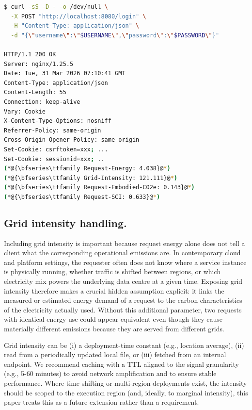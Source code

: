 \begin{lstlisting}[float,language=bash,caption={Example response headers from the prototype nginx module (from the outline).},label={lst:curl}]
$ curl -sS -D - -o /dev/null \
  -X POST "http://localhost:8080/login" \
  -H "Content-Type: application/json" \
  -d "{\"username\":\"$USERNAME\",\"password\":\"$PASSWORD\"}"

HTTP/1.1 200 OK
Server: nginx/1.25.5
Date: Tue, 31 Mar 2026 07:10:41 GMT
Content-Type: application/json
Content-Length: 55
Connection: keep-alive
Vary: Cookie
X-Content-Type-Options: nosniff
Referrer-Policy: same-origin
Cross-Origin-Opener-Policy: same-origin
Set-Cookie: csrftoken=xxx; ...
Set-Cookie: sessionid=xxx; ..
(*@{\bfseries\ttfamily Request-Energy: 4.038}@*)
(*@{\bfseries\ttfamily Grid-Intensity: 121.111}@*)
(*@{\bfseries\ttfamily Request-Embodied-CO2e: 0.143}@*)
(*@{\bfseries\ttfamily Request-SCI: 0.633}@*)
\end{lstlisting}


\subsection{Grid intensity handling.}
Including grid intensity is important because request energy alone does not tell a client what the corresponding operational emissions are. In contemporary cloud and platform settings, the requester often does not know where a service instance is physically running, whether traffic is shifted between regions, or which electricity mix powers the underlying data centre at a given time. Exposing grid intensity therefore makes a crucial hidden assumption explicit: it links the measured or estimated energy demand of a request to the carbon characteristics of the electricity actually used. Without this additional parameter, two requests with identical energy use could appear equivalent even though they cause materially different emissions because they are served from different grids.

Grid intensity can be (i) a deployment-time constant (e.g., location average), (ii) read from a periodically updated local file, or (iii) fetched from an internal endpoint. We recommend caching with a TTL aligned to the signal granularity (e.g., 5-60 minutes) to avoid network amplification and to ensure stable performance. Where time shifting or multi-region deployments exist, the intensity should be scoped to the execution region (and, ideally, to marginal intensity), this paper treats this as a future extension rather than a requirement.

